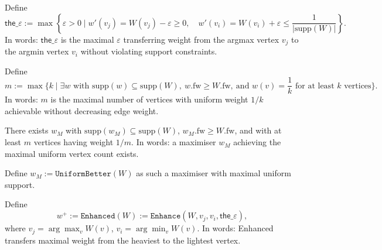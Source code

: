 \begin{definition}
  \label{def:the_eps}
  \leanok
Define
\[
\mathsf{the\_\varepsilon} := \max \left\{ \varepsilon > 0 \mid w'(v_j) = W(v_j) - \varepsilon \geq 0, \quad w'(v_i) = W(v_i) + \varepsilon \leq \frac{1}{|\mathrm{supp}(W)|} \right\}.
\]
In words: \(\mathsf{the\_\varepsilon}\) is the maximal \(\varepsilon\) transferring weight from the argmax vertex \(v_j\) to the argmin vertex \(v_i\) without violating support constraints.
\end{definition}

\begin{definition}
  \label{def:max_uniform_support}
  \leanok
Define
\[
m := \max \{ k \mid \exists w \text{ with } \mathrm{supp}(w) \subseteq \mathrm{supp}(W),\ w.\mathrm{fw} \geq W.\mathrm{fw},\ \text{and } w(v) = \frac{1}{k} \text{ for at least } k \text{ vertices} \}.
\]
In words: \(m\) is the maximal number of vertices with uniform weight \(1/k\) achievable without decreasing edge weight.
\end{definition}

\begin{lemma}
  \label{lem:exists_best_uniform}
  \leanok
There exists \(w_M\) with \(\mathrm{supp}(w_M) \subseteq \mathrm{supp}(W)\), \(w_M.\mathrm{fw} \geq W.\mathrm{fw}\), and with at least \(m\) vertices having weight \(1/m\).
In words: a maximiser \(w_M\) achieving the maximal uniform vertex count exists.
\end{lemma}

\begin{definition}[UniformBetter]
  \label{def:UniformBetter}
  \leanok
Define \(w_M := \texttt{UniformBetter}(W)\) as such a maximiser with maximal uniform support.
\end{definition}

\begin{definition}[Enhanced]
  \label{def:Enhanced}
  \leanok
Define
\[
w^+ := \texttt{Enhanced}(W) := \texttt{Enhance}(W, v_j, v_i, \mathsf{the\_\varepsilon}),
\]
where \(v_j = \arg\max_{v} W(v)\), \(v_i = \arg\min_{v} W(v)\).
In words: Enhanced transfers maximal weight from the heaviest to the lightest vertex.
\end{definition}


